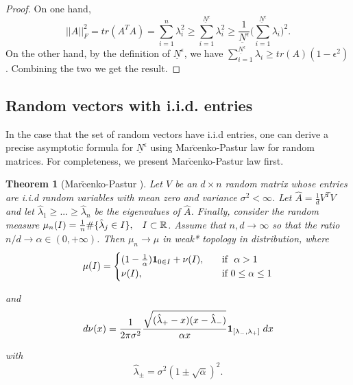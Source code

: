 \documentclass[11pt]{amsart}
\newtheorem{theorem}{Theorem}[section]
\begin{document}
\begin{proof}
On one hand,  
\begin{equation}
||A||_F^2=tr(A^TA) = \sum_{i=1}^n \lambda_i^2  \geq \sum_{i=1}^{\underline{N}^\epsilon} \lambda_i^2  \geq \frac{1}{\underline{N}^{\epsilon}} \big( \sum_{i=1}^{\underline{N}^{\epsilon}} \lambda_i \big)^2.
\end{equation}
On the other hand, by the definition of $\underline{N}^{\epsilon}$, we have $\sum_{i=1}^{\underline{N}^{\epsilon}} \lambda_i  \ge  tr(A)(1- \epsilon^2)$. Combining the two we get the result.
\end{proof}

\subsection{Random vectors with i.i.d. entries}
\label{sec:iid}
In the case that the set of random vectors have i.i.d entries, one can derive a precise asymptotic formula for $\underline{N}^{\epsilon}$ using Mar$\check{\text{c}}$enko-Pastur law for random matrices. For completeness, we present Mar$\check{\text{c}}$enko-Pastur law first. 

\begin{theorem}[Mar$\check{\text{c}}$enko-Pastur \label{mp} \cite{marvcenko1967distribution}] Let $V$ be an $d \times n$ random matrix whose entries are i.i.d random variables with mean zero and variance $\sigma^2 < \infty$.  Let $\hat{A} = \frac{1}{d}V^TV$ and let $\hat{\lambda}_1 \geq... \geq \hat{\lambda}_n$ be the eigenvalues of $\hat{A}$.  Finally, consider the random measure $\mu_n(I) = \frac{1}{n} \# \{\hat{\lambda}_j \in I \} , \hspace{3mm} I \subset \mathbb R$.  Assume that $n,d \rightarrow \infty$ so that the ratio $n/d \rightarrow \alpha \in (0, + \infty)$.  Then $\mu_n \rightarrow \mu$ in weak* topology in distribution, where 
\[ \mu(I) =
  \begin{cases}
    (1-\frac{1}{\alpha}){\bf 1}_{0 \in I} + \nu(I),       & \quad \text{if }  \text{ $\alpha > 1$}\\
    \nu(I), & \quad \text{if } \text{$0 \leq \alpha \leq 1$}\\
  \end{cases}
\]

and
$$d\nu(x) = \frac{1}{2 \pi \sigma ^2} \frac{\sqrt{(\hat{\lambda}_+-x)(x-\hat{\lambda}_-)}}{\alpha x} {\bf 1}_{[\lambda_-, \lambda_+]} \hspace{1mm} dx$$

with
$$\hat{\lambda}_{\pm} = \sigma ^2 (1 \pm \sqrt{\alpha})^2.$$ \\
\end{theorem}
\end{document}
